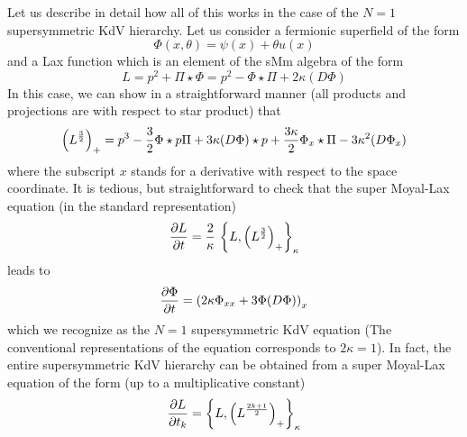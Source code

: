\documentclass[a4paper,11pt]{article}
\begin{document}
Let us describe in detail how all of this works in the case of the
$N=1$ supersymmetric KdV hierarchy. Let us consider a fermionic
superfield of the form
\begin{equation}
\Phi(x,\theta) = \psi(x) + \theta u(x)
\end{equation}
and a Lax function which is an element of the sMm algebra of the form
\begin{equation}
L = p^{2} + \Pi\star \Phi = p^{2} - \Phi\star \Pi + 2\kappa (D\Phi)
\end{equation}
In this case, we can show in a straightforward manner (all
products and projections are with respect to star product) that
\begin{equation}
\left(L^{3\over 2}\right)_{+} = p^{3} - {3\over 2}\Phi\star p\Pi +
3\kappa (D\Phi)\star p + {3\kappa\over 2} \Phi_{x}\star \Pi -
3\kappa^{2} (D\Phi_{x})
\end{equation}
where the subscript $x$ stands for a derivative with respect to the
space coordinate. It is tedious, but straightforward to check that the
super Moyal-Lax equation (in the standard representation)
\begin{equation}
{\partial L\over \partial t} = {2\over \kappa}\,\left\{L, \left(L^{3\over
2}\right)_{+}\right\}_{\kappa}\label{12}
\end{equation}
leads to
\begin{equation}
{\partial\Phi\over \partial t} = \left(2\kappa \Phi_{xx} + 3 \Phi
(D\Phi)\right)_{x}\label{13}
\end{equation}
which we recognize as the $N=1$ supersymmetric KdV equation \cite{2}
(The conventional representations of the equation corresponds to
$2\kappa=1$).  In fact,
the entire supersymmetric KdV hierarchy can be obtained from a super
Moyal-Lax equation of the form (up to a multiplicative constant)
\begin{equation}
{\partial L\over \partial t_{k}} = \left\{L, \left(L^{2k+1\over
2}\right)_{+}\right\}_{\kappa}\label{14}
\end{equation}
\end{document}
